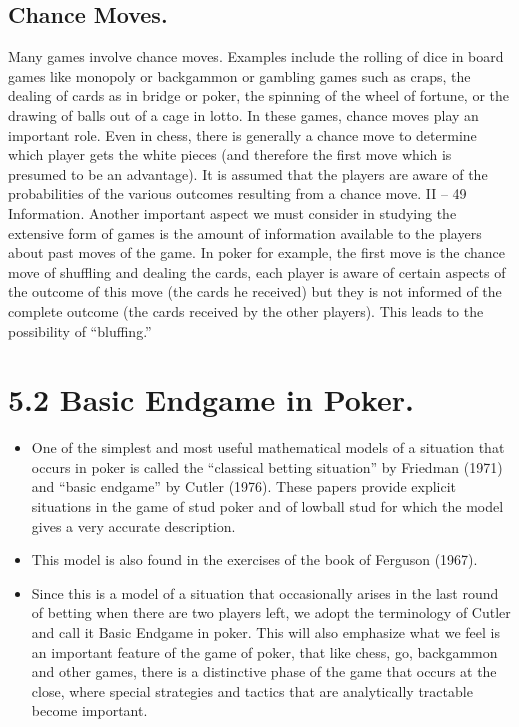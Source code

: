 \documentclass[]{report}
\begin{document}
\subsection{Chance Moves.} Many games involve chance moves. Examples include the rolling of
dice in board games like monopoly or backgammon or gambling games such as craps, the
dealing of cards as in bridge or poker, the spinning of the wheel of fortune, or the drawing
of balls out of a cage in lotto. In these games, chance moves play an important role. Even
in chess, there is generally a chance move to determine which player gets the white pieces
(and therefore the first move which is presumed to be an advantage). It is assumed that
the players are aware of the probabilities of the various outcomes resulting from a chance
move.
II – 49
Information. Another important aspect we must consider in studying the extensive
form of games is the amount of information available to the players about past moves of
the game. In poker for example, the first move is the chance move of shuffling and dealing
the cards, each player is aware of certain aspects of the outcome of this move (the cards he
received) but they is not informed of the complete outcome (the cards received by the other
players). This leads to the possibility of “bluffing.”

\section{5.2 Basic Endgame in Poker.} 
\begin{itemize}
\item One of the simplest and most useful mathematical
models of a situation that occurs in poker is called the “classical betting situation” by
Friedman (1971) and “basic endgame” by Cutler (1976). These papers provide explicit
situations in the game of stud poker and of lowball stud for which the model gives a very
accurate description. \item This model is also found in the exercises of the book of Ferguson
(1967).\item Since this is a model of a situation that occasionally arises in the last round of
betting when there are two players left, we adopt the terminology of Cutler and call it
Basic Endgame in poker. This will also emphasize what we feel is an important feature of
the game of poker, that like chess, go, backgammon and other games, there is a distinctive
phase of the game that occurs at the close, where special strategies and tactics that are
analytically tractable become important.
\end{itemize}
\end{document}
